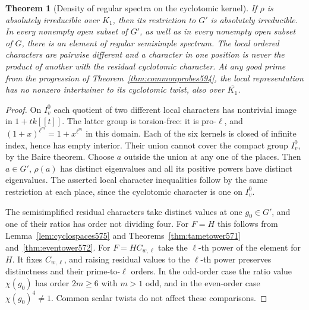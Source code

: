 \documentclass[a4paper,11pt]{article}
\newtheorem{theorem}[proposition]{Theorem}
\theoremstyle{definition}
\theoremstyle{remark}
\numberwithin{equation}{section}
\begin{document}
\begin{theorem}[Density of regular spectra on the cyclotomic kernel]
\leavevmode\label{thm:regularcosets597}
If \(\rho\) is absolutely irreducible over \(K_1\), then
its restriction to \(G'\) is absolutely irreducible. In
every nonempty open subset of \(G'\), as well as in every
nonempty open subset of \(G\), there is an element of
regular semisimple spectrum. The local ordered characters
are pairwise different and a character in one position is
never the product of another with the residual cyclotomic
character. At any good prime from the progression of
Theorem~\ref{thm:commonprobes594}, the local representation
has no nonzero intertwiner to its cyclotomic twist, also
over \(\overline{K_1}\).
\end{theorem}
\begin{proof}
On \(I_v^0\) each quotient of two different local characters
has nontrivial image in \(1+tk[[t]]\). The latter group
is torsion-free: it is pro-\(\ell\), and
\((1+x)^{\ell^m}=1+x^{\ell^m}\) in this domain.
Each of the six kernels is closed of infinite index,
hence has empty interior. Their union cannot cover the
compact group \(I_v^0\), by the Baire theorem. Choose
\(a\) outside the union at any one of the places.
Then \(a\in G'\), \(\rho(a)\) has distinct eigenvalues
and all its positive powers have distinct eigenvalues.
The asserted local character inequalities follow by the
same restriction at each place, since the cyclotomic
character is one on \(I_v^0\).

The semisimplified residual characters take distinct values
at one \(g_0\in G'\), and one of their ratios has order
not dividing four. For \(F=H\) this follows from
Lemma~\ref{lem:cyclospaces575} and
Theorems~\ref{thm:tametower571} and~\ref{thm:eventower572}.
For \(F=HC_{w,\ell}\) take the \(\ell\)-th power of the
element for \(H\). It fixes \(C_{w,\ell}\), and raising
residual values to the \(\ell\)-th power preserves
distinctness and their prime-to-\(\ell\) orders. In the
odd-order case the ratio value \(\chi(g_0)\) has order \(2m\ge6\)
with \(m>1\) odd, and in the even-order case
\(\chi(g_0)^4\ne1\). Common scalar twists do not affect
these comparisons.


\end{proof}
\end{document}
